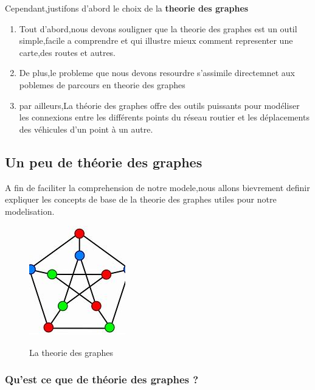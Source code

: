 \documentclass{article}
\begin{document}
Cependant,justifons d'abord le choix de la \textbf{theorie des graphes}
\begin{enumerate}
    \item Tout d'abord,nous devons souligner que la theorie des graphes est un outil simple,facile a comprendre et qui illustre mieux comment representer une carte,des routes et autres.
    \item De plus,le probleme que nous devons resourdre s'assimile directemnet aux poblemes de parcours en  theorie des graphes
    \item par ailleurs,La théorie des graphes offre des outils puissants pour modéliser les connexions entre les différents points du réseau routier et les déplacements des véhicules d'un point à un autre.
\end{enumerate}




\subsection{Un peu de théorie des graphes}
A fin de faciliter la comprehension de notre modele,nous allons bievrement definir expliquer les concepts de base de la theorie des graphes utiles pour notre modelisation. 

\begin{figure}[h]
    \centering
    \includegraphics[width=0.5\linewidth]{Images/Theory.jpeg}
    \caption{La theorie des graphes}
    \label{fig:un peu de theorie des graphes}
    \cite{graph_image}
\end{figure}


\subsubsection{Qu'est ce que de théorie des graphes ?}
\end{document}

